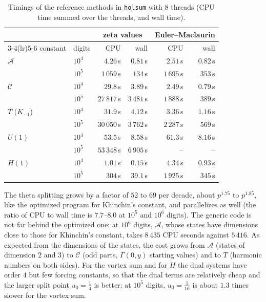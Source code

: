 \documentclass[11pt]{amsart}
\theoremstyle{definition}
\theoremstyle{remark}
\begin{document}
\begin{table}[tp]
\begin{tabular}{llrrrr}
\toprule
& & \multicolumn{2}{c}{zeta values} & \multicolumn{2}{c}{Euler--Maclaurin} \\
\cmidrule(lr){3-4}\cmidrule(lr){5-6}
constant & digits & CPU & wall & CPU & wall \\
\midrule
$\mathcal A$ & $10^4$ & $4.26$\,s & $0.81$\,s & $2.51$\,s & $0.82$\,s \\
 & $10^5$ & $1\,059$\,s & $134$\,s & $1\,695$\,s & $353$\,s \\
\midrule
$\mathcal C$ & $10^4$ & $29.8$\,s & $3.89$\,s & $2.49$\,s & $0.79$\,s \\
 & $10^5$ & $27\,817$\,s & $3\,481$\,s & $1\,888$\,s & $389$\,s \\
\midrule
$T$ ($K_{-1}$) & $10^4$ & $31.9$\,s & $4.12$\,s & $3.36$\,s & $1.16$\,s \\
 & $10^5$ & $30\,050$\,s & $3\,762$\,s & $2\,287$\,s & $569$\,s \\
\midrule
$U(1)$ & $10^4$ & $53.5$\,s & $8.58$\,s & $61.3$\,s & $8.16$\,s \\
 & $10^5$ & $53\,348$\,s & $6\,905$\,s & -- & -- \\
\midrule
$H(1)$ & $10^4$ & $1.01$\,s & $0.15$\,s & $4.34$\,s & $0.93$\,s \\
 & $10^5$ & $304$\,s & $39.1$\,s & $1\,925$\,s & $345$\,s \\
\bottomrule
\end{tabular}
\vspace{\abovecaptionskip}
\caption{Timings of the reference methods in \texttt{holsum} with $8$ threads (CPU time summed over the threads, and wall time).}
\label{tab:appsref}
\end{table}

The theta splitting grows by a factor of $52$ to $69$ per decade, about $p^{1.75}$ to $p^{1.85}$, like the optimized
program for Khinchin's constant, and parallelizes as well (the ratio of CPU to wall time is $7.7$--$8.0$ at $10^5$ and
$10^6$ digits). The generic code is not far behind the optimized one: at $10^6$ digits, $\mathcal A$, whose states have
dimensions close to those for Khinchin's constant, takes $8\,435$ CPU seconds against $5\,416$. As expected from the
dimensions of the states, the cost grows from $\mathcal A$ (states of dimension $2$ and $3$) to $\mathcal C$ (odd
parts, $\Gamma(0,y)$ starting values) and to $T$ (harmonic numbers on both sides). For the vortex sum and for $H$ the
dual systems have order $4$ but few forcing constants, so that the dual terms are relatively cheap and the larger
split point $u_0 = \frac14$ is better; at $10^5$ digits, $u_0 = \frac1{16}$ is about $1.3$ times slower for the vortex
sum.
\end{document}
